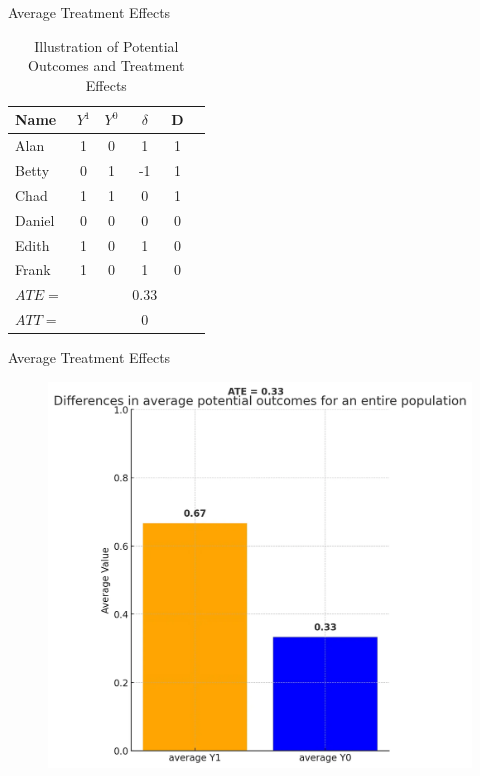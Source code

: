 \documentclass{beamer}
\begin{document}
\begin{frame}{Average Treatment Effects}

\begin{table}[htbp]\centering
\caption{Illustration of Potential Outcomes and Treatment Effects}\label{tab:step1_table}
\begin{tabular}{lccccc}
\toprule
\textbf{Name} & \textbf{$Y^1$} & \textbf{$Y^0$} & \textbf{$\delta$} & \textbf{D}  \\
\midrule
Alan    & 1 & 0 & 1  & 1  \\
Betty   & 0 & 1 & -1 & 1  \\
Chad    & 1 & 1 & 0  & 1  \\
Daniel  & 0 & 0 & 0  & 0  \\
Edith   & 1 & 0 & 1  & 0  \\
Frank   & 1 & 0 & 1  & 0  \\
\midrule
$ATE =$&&& 0.33 \\
$ATT =$&&&0 \\
\bottomrule
\end{tabular}
\end{table}  

\end{frame}

\begin{frame}{Average Treatment Effects}

\begin{figure}
    \centering
    \includegraphics[height=0.8\textheight]{./lecture_includes/step1_y1y0}
\end{figure}


\end{frame}
\end{document}
